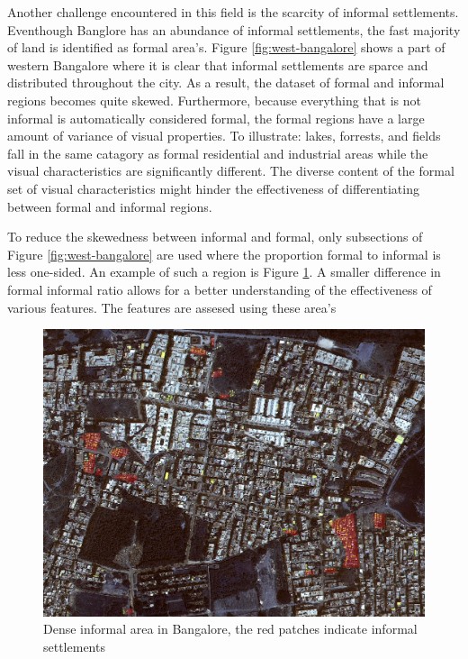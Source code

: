 Another challenge encountered in this field is the scarcity of informal
settlements.  Eventhough Banglore  has an abundance of informal settlements,
the fast majority of land is identified as formal area's. Figure
\ref{fig:west-bangalore} shows a part of western Bangalore where it is clear
that informal settlements are sparce and distributed throughout the city. As
a result, the dataset of formal and informal regions becomes quite skewed.
Furthermore, because everything that is not informal is automatically
considered formal, the formal regions have a large amount of variance of visual
properties.  To illustrate: lakes, forrests, and fields fall in the same
catagory as formal residential and industrial areas while the visual
characteristics are significantly different. The diverse content of the formal
set of visual characteristics might hinder the effectiveness of differentiating
between formal and informal regions. 

To reduce the skewedness between informal and formal, only subsections of Figure \ref{fig:west-bangalore} are
used where the proportion formal to informal is less one-sided. An example of
such a region is Figure \ref{fig:section_3}. A smaller difference in formal
informal ratio allows for a better understanding of the effectiveness of
various features. The features are assesed using these area's 

\begin{figure}
\centering
  \includegraphics[width=\linewidth]{images/section_3}
  \caption{Dense informal area in Bangalore, the red patches indicate informal
  settlements}
  \label{fig:section_3}
\end{figure}

